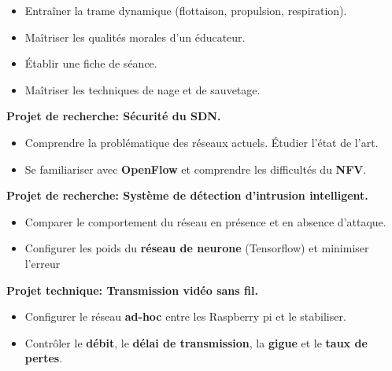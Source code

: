 \documentclass[10pt,a4paper]{.altacv}
\begin{document}
\divider

\begin{itemize}
	\item Entraîner la trame dynamique (flottaison, propulsion, respiration).
	\item Maîtriser les qualités morales d'un éducateur.
	\item Établir une fiche de séance.
	\item Maîtriser les techniques de nage et de sauvetage.
\end{itemize}



\textbf{\large Projet de recherche: Sécurité du SDN.}
\medskip
\begin{itemize}
	\item Comprendre la problématique des réseaux actuels. Étudier l’état de l’art.
	\item Se familiariser avec \textbf {OpenFlow} et comprendre les difficultés du \textbf {NFV}.
\end{itemize}

\divider

\textbf{\large Projet de recherche: Système de détection d'intrusion intelligent.}
\medskip
\begin{itemize}
	\item Comparer le comportement du réseau en présence et en absence d'attaque.
	\item Configurer les poids du \textbf {réseau de neurone} (Tensorflow) et minimiser l'erreur
\end{itemize}

\divider

\textbf{\large Projet technique: Transmission vidéo sans fil.}
\medskip
\begin{itemize}
	\item Configurer le réseau \textbf {ad-hoc} entre les Raspberry pi et le stabiliser.
	\item Contrôler le \textbf {débit}, le \textbf  {délai de transmission}, la \textbf {gigue} et le \textbf {taux de pertes}.
\end{itemize}

\divider

\end{document}
